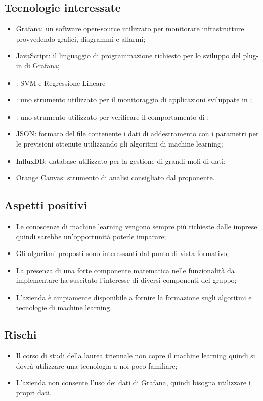 \documentclass[../studio-di-fattibilita.tex]{subfiles}
\begin{document}
\subsection{Tecnologie interessate}%
\label{sub:tecnologie_interessate}
\begin{itemize}
  \item Grafana: un software open-source utilizzato per monitorare infrastrutture provvedendo grafici, diagrammi e allarmi;
  \item JavaScript: il linguaggio di programmazione richiesto per lo sviluppo del plug-in di Grafana;
  \item {}: SVM e Regressione Lineare
  \item {}: uno strumento utilizzato per il monitoraggio di applicazioni sviluppate in ;
  \item {}: uno strumento utilizzato per verificare il comportamento di ;
  \item JSON: formato del file contenente i dati di addestramento con i parametri per le previsioni ottenute utilizzando gli algoritmi di machine learning;
  \item InfluxDB: database utilizzato per la gestione di grandi moli di dati;
  \item Orange Canvas: strumento di analisi consigliato dal proponente.
\end{itemize}

\subsection{Aspetti positivi}%
\label{sub:aspetti_positivi}
\begin{itemize}
  \item Le conoscenze di machine learning vengono sempre più richieste dalle imprese quindi sarebbe un’opportunità poterle imparare;
  \item Gli algoritmi proposti sono interessanti dal punto di vista formativo;
  \item La presenza di una forte componente matematica nelle funzionalità da implementare ha suscitato l'interesse di diversi componenti del gruppo;
  \item L’azienda è ampiamente disponibile a fornire la formazione sugli algoritmi e tecnologie di machine learning.
\end{itemize}

\subsection{Rischi}%
\label{sub:rischi}
\begin{itemize}
  \item Il corso di studi della laurea triennale non copre il machine learning quindi si dovrà utilizzare una tecnologia a noi poco familiare;
  \item L'azienda non consente l'uso dei dati di Grafana, quindi bisogna utilizzare i propri dati.
\end{itemize}
\end{document}
